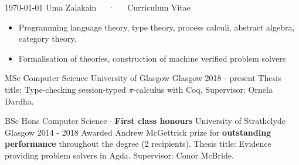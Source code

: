 \documentclass[11pt, a4paper]{awesome-cv}
\begin{document}
\makecvheader

\makecvfooter
  {\today}
  {Uma Zalakain~~~·~~~Curriculum Vitae}
  {\thepage}



\begin{itemize}[noitemsep,wide=0pt]
    \item {Programming language theory, type theory, process calculi, abstract
        algebra, category theory.}
    \item {Formalisation of theories, construction of machine verified
        problem solvers}
\end{itemize}


\begin{cventries}
    \cventry
      {MSc Computer Science} %
      {University of Glasgow} %
      {Glasgow} %
      {2018 - present} %
      {
          Thesis title: Type-checking session-typed $\pi$-calculus with Coq.\newline
          Supervisor: Ornela Dardha.\newline
      }

    \cventry
      {BSc Hons Computer Science $\cdot$ \textbf{First class honours}} %
      {University of Strathclyde} %
      {Glasgow} %
      {2014 - 2018} %
      {
          Awarded Andrew McGettrick prize for \textbf{outstanding performance}
          throughout the degree (2 recipients).\newline
          Thesis title: Evidence providing problem solvers in Agda.\newline
          Supervisor: Conor McBride.\newline
      }
\end{cventries}

\end{document}
